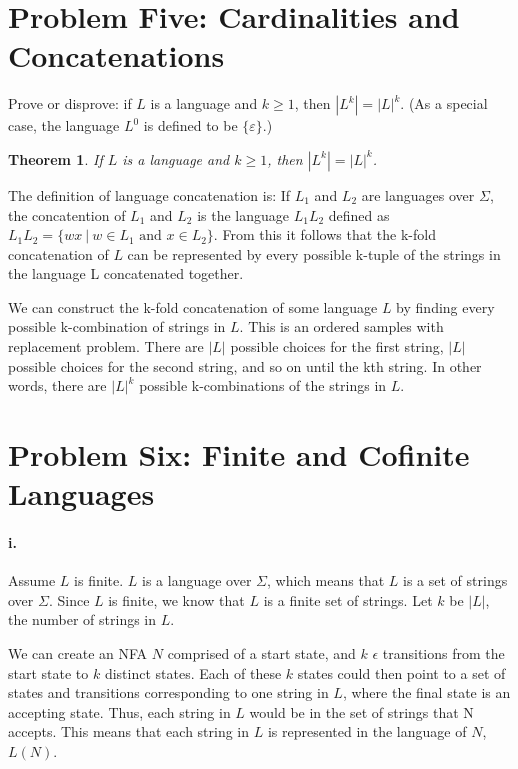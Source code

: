 \documentclass[10pt,letter]{article}
\newtheorem*{thm}{Theorem}
\begin{document}
\section*{Problem Five: Cardinalities and Concatenations}
Prove or disprove: if $L$ is a language and $k \ge 1$, then $|L^k| = |L|^k$. (As a special case, the language $L^0$ is defined to be $\{\varepsilon\}$.)

\begin{thm}
If $L$ is a language and $k \ge 1$, then $|L^k| = |L|^k$.
\end{thm}

The definition of language concatenation is: If $L_1$ and $L_2$ are languages over $\Sigma$, the concatention of $L_1$ and $L_2$ is the language $L_1L_2$ defined as $L_1L_2 = \{ wx \ | \ w \in L_1 \text{ and } x \in L_2 \}$. From this it follows that the k-fold concatenation of $L$ can be represented by every possible k-tuple of the strings in the language L concatenated together.

We can construct the k-fold concatenation of some language $L$ by finding every possible k-combination of strings in $L$. This is an ordered samples with replacement problem. There are $|L|$ possible choices for the first string, $|L|$ possible choices for the second string, and so on until the kth string. In other words, there are $|L|^k$ possible k-combinations of the strings in $L$. 

\section*{Problem Six: Finite and Cofinite Languages}

\paragraph{i.} 

Assume $L$ is finite. $L$ is a language over $\Sigma$, which means that $L$ is a set of strings over $\Sigma$. Since $L$ is finite, we know that $L$ is a finite set of strings. Let $k$ be $|L|$, the number of strings in $L$.

We can create an NFA $N$ comprised of a start state, and $k$ $\epsilon$ transitions from the start state to $k$ distinct states. Each of these $k$ states could then point to a set of states and transitions corresponding to one string in $L$, where the final state is an accepting state. Thus, each string in $L$ would be in the set of strings that N accepts. This means that each string in $L$ is represented in the language of $N$, $L(N)$.
\end{document}
